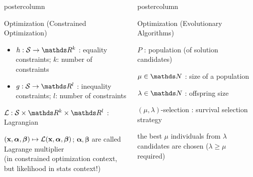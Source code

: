 \documentclass{beamer}
\newlength{\columnheight} %
\begin{document}
\begin{frame}[fragile]{}
\begin{columns}
\begin{column}{.31\textwidth}
\begin{beamercolorbox}[center]{postercolumn}
\begin{minipage}{.98\textwidth}
{\begin{myblock}{Optimization (Constrained Optimization)}
\begin{itemize}
							\item \quad $h: \mathcal{S} \to \R^k$ : equality constraints; $k$: number of constraints\\
							\item \quad $g: \mathcal{S} \to \R^l$ : inequality constraints; $l$: number of constraints
						\end{itemize} \hspace{1ex} 
						\begin{codebox}
							 $\mathcal{L}: \mathcal{S} \times \R^k \times \R^l$ : Lagrangian
						\end{codebox}
						\hspace*{1ex} $(\mathbf{x}, \bm{\alpha}, \bm{\beta}) \mapsto \mathcal{L}(\mathbf{x}, \bm{\alpha}, \bm{\beta})$; $\bm{\alpha}, \bm{\beta}$ are called Lagrange multiplier \\
						\hspace*{1ex} (in constrained optimization context, but likelihood in stats context!)
					\end{myblock}											
					}
			\end{minipage}
		\end{beamercolorbox}
	\end{column}
	\begin{column}{.31\textwidth}
		\begin{beamercolorbox}[center]{postercolumn}
			\begin{minipage}{.98\textwidth}
				\parbox[t][\columnheight]{\textwidth}{
					\begin{myblock}{Optimization (Evolutionary Algorithms)}
						\begin{codebox}
							 $P$ : population (of solution candidates)
						\end{codebox}
						\hspace*{1ex} 
						\begin{codebox}
							 $\mu \in \N$ : size of a population
						\end{codebox}
						\hspace*{1ex} 
						\begin{codebox}
							 $\lambda \in \N$ : offspring size
						\end{codebox}
						\hspace*{1ex} 
						\begin{codebox}
							 $(\mu, \lambda)$-selection : survival selection strategy
						\end{codebox}
						\hspace*{1ex} the best $\mu$ individuals from $\lambda$ candidates are chosen ($\lambda \ge \mu$ required) \\

\end{myblock}}
\end{minipage}
\end{beamercolorbox}
\end{column}
\end{columns}
\end{frame}
\end{document}
